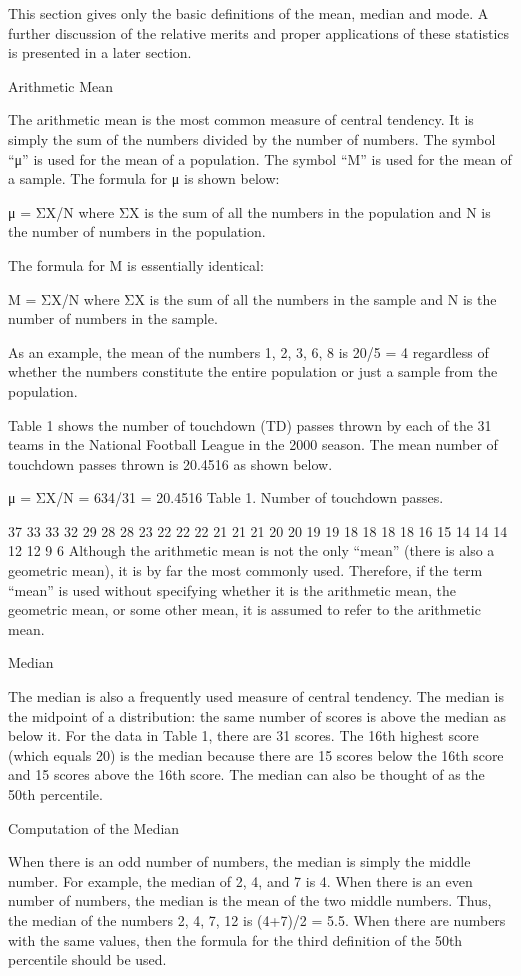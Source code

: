 \documentclass[
]{book}
\begin{document}
This section gives only the basic definitions of the mean, median and mode. A further discussion of the relative merits and proper applications of these statistics is presented in a later section.

Arithmetic Mean

The arithmetic mean is the most common measure of central tendency. It is simply the sum of the numbers divided by the number of numbers. The symbol ``μ'' is used for the mean of a population. The symbol ``M'' is used for the mean of a sample. The formula for μ is shown below:

μ = ΣX/N
where ΣX is the sum of all the numbers in the population and
N is the number of numbers in the population.

The formula for M is essentially identical:

M = ΣX/N
where ΣX is the sum of all the numbers in the sample and
N is the number of numbers in the sample.

As an example, the mean of the numbers 1, 2, 3, 6, 8 is 20/5 = 4 regardless of whether the numbers constitute the entire population or just a sample from the population.

Table 1 shows the number of touchdown (TD) passes thrown by each of the 31 teams in the National Football League in the 2000 season. The mean number of touchdown passes thrown is 20.4516 as shown below.

μ = ΣX/N
= 634/31
= 20.4516
Table 1. Number of touchdown passes.

37 33 33 32 29 28 28 23 22 22 22 21 21 21 20 20 19 19 18 18 18 18 16 15 14 14 14 12 12 9 6
Although the arithmetic mean is not the only ``mean'' (there is also a geometric mean), it is by far the most commonly used. Therefore, if the term ``mean'' is used without specifying whether it is the arithmetic mean, the geometric mean, or some other mean, it is assumed to refer to the arithmetic mean.

Median

The median is also a frequently used measure of central tendency. The median is the midpoint of a distribution: the same number of scores is above the median as below it. For the data in Table 1, there are 31 scores. The 16th highest score (which equals 20) is the median because there are 15 scores below the 16th score and 15 scores above the 16th score. The median can also be thought of as the 50th percentile.

Computation of the Median

When there is an odd number of numbers, the median is simply the middle number. For example, the median of 2, 4, and 7 is 4. When there is an even number of numbers, the median is the mean of the two middle numbers. Thus, the median of the numbers 2, 4, 7, 12 is (4+7)/2 = 5.5. When there are numbers with the same values, then the formula for the third definition of the 50th percentile should be used.
\end{document}
